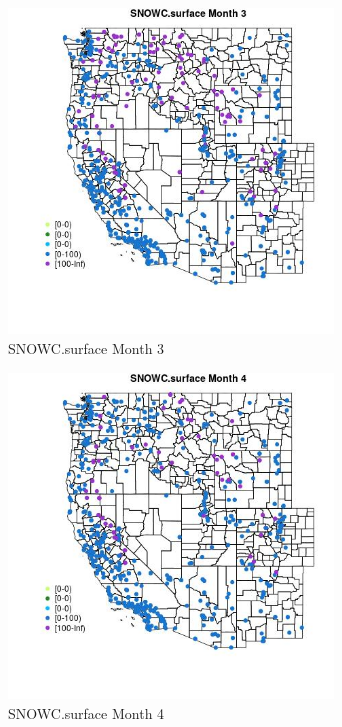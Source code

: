 \begin{figure} 
\centering  
\includegraphics[width=0.77\textwidth]{Code_Outputs/Report_ML_input_PM25_Step4_part_e_de_duplicated_aves_compiled_2019-05-14wNAs_MapObsMo3SNOWCsurface.jpg} 
\caption{\label{fig:Report_ML_input_PM25_Step4_part_e_de_duplicated_aves_compiled_2019-05-14wNAsMapObsMo3SNOWCsurface}SNOWC.surface Month 3} 
\end{figure} 
 

\begin{figure} 
\centering  
\includegraphics[width=0.77\textwidth]{Code_Outputs/Report_ML_input_PM25_Step4_part_e_de_duplicated_aves_compiled_2019-05-14wNAs_MapObsMo4SNOWCsurface.jpg} 
\caption{\label{fig:Report_ML_input_PM25_Step4_part_e_de_duplicated_aves_compiled_2019-05-14wNAsMapObsMo4SNOWCsurface}SNOWC.surface Month 4} 
\end{figure} 
 

